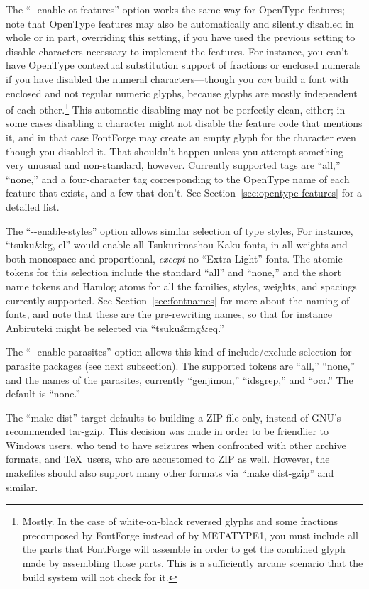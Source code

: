 \documentclass[14pt]{extarticle}
\begin{document}
The ``-{}-enable-ot-features'' option works the same way for OpenType
features; note that OpenType features may also be automatically and silently
disabled in whole or in part, overriding this setting, if you have used the
previous setting to disable characters necessary to implement the features. 
For instance, you can't have OpenType contextual substitution support of
fractions or enclosed numerals if you have disabled the numeral
characters---though you \emph{can} build a font with enclosed and not
regular numeric glyphs, because glyphs are mostly independent of each
other.\footnote{Mostly.  In the case of white-on-black reversed glyphs and
some fractions precomposed by FontForge instead of by METATYPE1, you
must include all the parts that FontForge will assemble in order to get the
combined glyph made by assembling those parts.  This is a sufficiently
arcane scenario that the build system will not check for it.}
This automatic disabling may not be perfectly clean, either; in some cases
disabling a character might not disable the feature code that mentions it,
and in that case FontForge may create an empty glyph for the character even
though you disabled it.  That shouldn't happen unless you attempt something
very unusual and non-standard, however. Currently supported tags are
``all,'' ``none,'' and a four-character tag corresponding to the OpenType
name of each feature that exists, and a few that don't.  See
Section~\ref{sec:opentype-features} for a detailed list.

The ``-{}-enable-styles'' option allows similar selection of type styles,
For instance, ``tsuku\&kg,-el'' would enable all
Tsukurimashou Kaku fonts, in all weights and both monospace and
proportional, \emph{except} no ``Extra Light'' fonts.  The atomic tokens for
this selection include the standard ``all'' and ``none,'' and the short
name tokens and Hamlog atoms for all the families, styles, weights, and
spacings currently supported.  See Section~\ref{sec:fontnames} for more
about the naming of fonts, and note that these are the pre-rewriting names,
so that for instance Anbiruteki might be selected via ``tsuku\&mg\&eq.''

The ``-{}-enable-parasites'' option allows this kind of include/exclude
selection for parasite packages (see next subsection).  The supported tokens
are ``all,'' ``none,'' and the names of the parasites, currently
``genjimon,'' ``idsgrep,'' and ``ocr.''  The default is ``none.''

The ``make dist'' target defaults to building a ZIP file only, instead of
GNU's recommended tar-gzip.  This decision was made in order to be
friendlier to Windows users, who tend to have seizures when confronted with
other archive formats, and \TeX\ users, who are accustomed to ZIP as well. 
However, the makefiles should also support many other formats via ``make
dist-gzip'' and similar.
\end{document}
